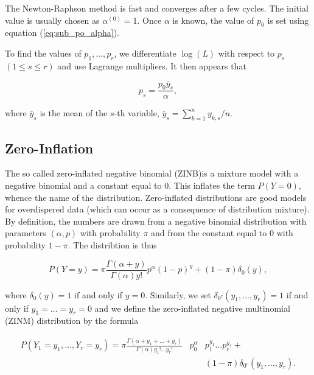 \documentclass[12pt]{article}
\begin{document}
    The Newton-Raphson method is fast and converges after a few
    cycles. The initial value is usually chosen as
    $\alpha^{(0)} = 1$.
    Once $\alpha$ is known, the value of $p_0$ is set using
    equation (\ref{eq:sub_po_alpha}).

    To find the values of $p_1, \ldots, p_r$, we differentiate
    $\log(L)$ with respect to $p_s$ $(1 \leq s \leq r)$ and use
    Lagrange multipliers. It then appears that

    \begin{equation}
      p_s = \frac{p_0 \bar{y}_s}{\alpha},
    \end{equation}

    \noindent
    where $\bar{y}_s$ is the mean of the $s$-th variable,
    $\bar{y}_s = \sum_{k=1}^n y_{k,s}/n$.

\subsection{Zero-Inflation}

    The so called zero-inflated negative binomial (ZINB)is a mixture
    model with a negative binomial and a constant equal to 0. This 
    inflates the term $P(Y=0)$, whence the name of the distribution.
    Zero-inflated distributions are good models for overdispered
    data (which can occur as a consequence of distribution mixture).
    By definition, the numbers are drawn from a negative binomial
    distribution with parameters $(\alpha, p)$ with probability
    $\pi$ and from the constant equal to 0 with probability
    $1-\pi$. The distribtion is thus

    \begin{equation*}
    P(Y = y) = \pi\frac{\Gamma(\alpha+y)}{\Gamma(\alpha)y!}
    p^{\alpha}(1-p)^y + (1-\pi)\delta_0(y),
    \end{equation*}

    \noindent
    where $\delta_0(y) = 1$ if and only if $y=0$. Similarly,
    we set $\delta_{0^r}(y_1, \ldots, y_r) = 1$ if and only
    if $y_1=\ldots =y_r = 0$ and we define the zero-inflated negative
    multinomial (ZINM) distribution by the formula

    \begin{eqnarray}
      P(Y_1 = y_1, \ldots, Y_r = y_r) = \pi
       \frac{\Gamma(\alpha+y_1+\ldots+y_r)}
       {\Gamma(\alpha)y_1!\ldots y_r!}
\label{eq:zinm}
       &p_0^{\alpha}& p_1^{y_1} \ldots p_r^{y_r} + \\
       &\;& (1-\pi)\delta_{0^r}(y_1, \ldots, y_r). \nonumber
    \end{eqnarray}
\end{document}

